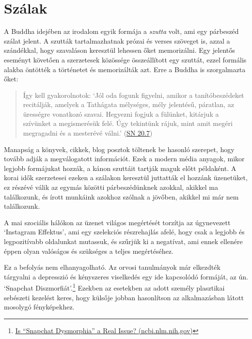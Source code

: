 \vfill\null

\clearpage

\section{Szálak}


\noindent A Buddha idejében az irodalom egyik formája a \emph{szutta}
volt, ami egy párbeszéd szálat jelent. A szutták tartalmazhatnak prózai
és verses szöveget is, azzal a szándékkal, hogy szavaláson keresztül
lehessen őket memorizálni. Egy jelentős eseményt követően a szerzetesek
közössége összeállított egy szuttát, ezzel formális alakba öntötték a
történetet és memorizálták azt. Erre a Buddha is szorgalmazta őket:

\begin{quote}
Így kell gyakorolnotok: `Jól oda fogunk figyelni, amikor a
tanítóbeszédeket recitálják, amelyek a Tathágata mélységes, mély
jelentésű, páratlan, az ürességre vonatkozó szavai. Hegyezni fogjuk a
fülünket, kitárjuk a szívünket a megismerésük felé. Úgy tekintünk rájuk,
mint amit megéri megragadni és a mesterévé válni.'
(\href{https://a-buddha-ujja.hu/sn-20.7/hu/fenyvesi-robert}{SN 20.7})
\end{quote}

Manapság a könyvek, cikkek, blog posztok töltenek be hasonló szerepet,
hogy tovább adják a megválogatott információt. Ezek a modern média
anyagok, mikor legjobb formájukat hozzák, a kánon szuttáit tartják maguk
előtt példaként. A korai idők szerzetesei ezeken a szálakon keresztül
juttatták el hozzánk üzenetüket, ez részévé válik az egymás közötti
párbeszédünknek azokkal, akikkel ma találkozunk, és írott munkáink
azokhoz szólnak a jövőben, akikkel mi már nem találkozunk.

\clearpage


A mai szociális hálókon az üzenet világos megértését torzítja az
úgynevezett `Instagram Effektus', ami egy szelekciós részrehajlás afelé,
hogy csak a legjobb és legpozitívabb oldalunkat mutassuk, és szűrjük ki
a negatívat, ami ennek ellenére éppen olyan valóságos és szükséges a
teljes megértéséhez.

Ez a befolyás nem elhanyagolható. Az orvosi tanulmányok már elkezdték
tárgyalni a depresszió és kényszeres viselkedés egy ide kapcsolódó
formáját, az ún. `Snapchat Diszmorfiát'.\footnote{\href{https://www.ncbi.nlm.nih.gov/pmc/articles/PMC5933578/}{Is
  ``Snapchat Dysmorphia'' a Real Issue? (ncbi.nlm.nih.gov)}} Ezekben az
esetekben az adott személy plasztikai sebészeti kezelést keres, hogy
külsője jobban hasonlítson az alkalmazásban látott mosolygó
fényképekhez.

